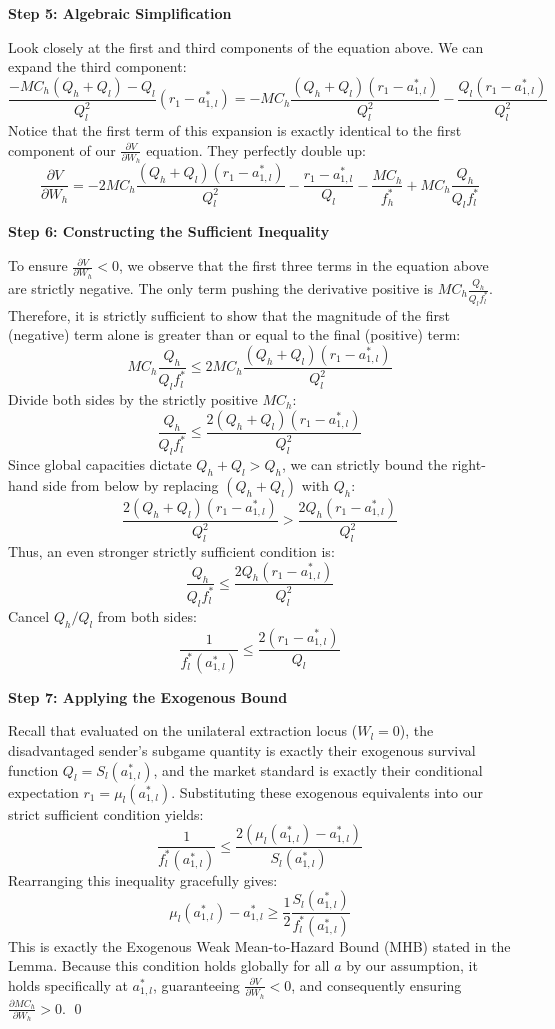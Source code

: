 \documentclass[12pt, a4paper]{article}
\begin{document}
\textbf{Step 5: Algebraic Simplification}

Look closely at the first and third components of the equation above. We can expand the third component:
\[
    \frac{-MC_h(Q_h + Q_l) - Q_l}{Q_l^2} (r_1 - a_{1,l}^*) = -MC_h \frac{(Q_h + Q_l)(r_1 - a_{1,l}^*)}{Q_l^2} - \frac{Q_l(r_1 - a_{1,l}^*)}{Q_l^2}
\]
Notice that the first term of this expansion is exactly identical to the first component of our $\frac{\partial V}{\partial W_h}$ equation. They perfectly double up:
\[
    \frac{\partial V}{\partial W_h} = -2 MC_h \frac{(Q_h + Q_l)(r_1 - a_{1,l}^*)}{Q_l^2} - \frac{r_1 - a_{1,l}^*}{Q_l} - \frac{MC_h}{f_h^*} + MC_h \frac{Q_h}{Q_l f_l^*}
\]

\textbf{Step 6: Constructing the Sufficient Inequality}

To ensure $\frac{\partial V}{\partial W_h} < 0$, we observe that the first three terms in the equation above are strictly negative. The only term pushing the derivative positive is $MC_h \frac{Q_h}{Q_l f_l^*}$.
Therefore, it is strictly sufficient to show that the magnitude of the first (negative) term alone is greater than or equal to the final (positive) term:
\[
    MC_h \frac{Q_h}{Q_l f_l^*} \le 2 MC_h \frac{(Q_h + Q_l)(r_1 - a_{1,l}^*)}{Q_l^2}
\]
Divide both sides by the strictly positive $MC_h$:
\[
    \frac{Q_h}{Q_l f_l^*} \le \frac{2 (Q_h + Q_l)(r_1 - a_{1,l}^*)}{Q_l^2}
\]
Since global capacities dictate $Q_h + Q_l > Q_h$, we can strictly bound the right-hand side from below by replacing $(Q_h + Q_l)$ with $Q_h$:
\[
    \frac{2 (Q_h + Q_l)(r_1 - a_{1,l}^*)}{Q_l^2} > \frac{2 Q_h (r_1 - a_{1,l}^*)}{Q_l^2}
\]
Thus, an even stronger strictly sufficient condition is:
\[
    \frac{Q_h}{Q_l f_l^*} \le \frac{2 Q_h (r_1 - a_{1,l}^*)}{Q_l^2}
\]
Cancel $Q_h / Q_l$ from both sides:
\[
    \frac{1}{f_l^*(a_{1,l}^*)} \le \frac{2 (r_1 - a_{1,l}^*)}{Q_l}
\]

\textbf{Step 7: Applying the Exogenous Bound}

Recall that evaluated on the unilateral extraction locus ($W_l = 0$), the disadvantaged sender's subgame quantity is exactly their exogenous survival function $Q_l = S_l(a_{1,l}^*)$, and the market standard is exactly their conditional expectation $r_1 = \mu_l(a_{1,l}^*)$.
Substituting these exogenous equivalents into our strict sufficient condition yields:
\[
    \frac{1}{f_l^*(a_{1,l}^*)} \le \frac{2 (\mu_l(a_{1,l}^*) - a_{1,l}^*)}{S_l(a_{1,l}^*)}
\]
Rearranging this inequality gracefully gives:
\[
    \mu_l(a_{1,l}^*) - a_{1,l}^* \ge \frac{1}{2} \frac{S_l(a_{1,l}^*)}{f_l^*(a_{1,l}^*)}
\]
This is exactly the Exogenous Weak Mean-to-Hazard Bound (MHB) stated in the Lemma. Because this condition holds globally for all $a$ by our assumption, it holds specifically at $a_{1,l}^*$, guaranteeing $\frac{\partial V}{\partial W_h} < 0$, and consequently ensuring $\frac{\partial MC_h}{\partial W_h} > 0$. \qed
\end{document}

